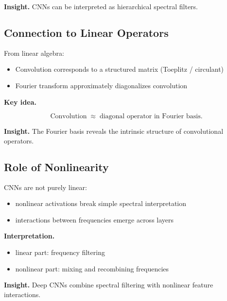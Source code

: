 \medskip

\noindent
\textbf{Insight.}  
CNNs can be interpreted as hierarchical spectral filters.

\subsection{Connection to Linear Operators}

From linear algebra:

\begin{itemize}
    \item Convolution corresponds to a structured matrix (Toeplitz / circulant)
    \item Fourier transform approximately diagonalizes convolution
\end{itemize}

\medskip

\noindent
\textbf{Key idea.}

\[
\text{Convolution} \;\approx\; \text{diagonal operator in Fourier basis}.
\]

\medskip

\noindent
\textbf{Insight.}  
The Fourier basis reveals the intrinsic structure of convolutional operators.

\subsection{Role of Nonlinearity}

CNNs are not purely linear:

\begin{itemize}
    \item nonlinear activations break simple spectral interpretation
    \item interactions between frequencies emerge across layers
\end{itemize}

\medskip

\noindent
\textbf{Interpretation.}

\begin{itemize}
    \item linear part: frequency filtering
    \item nonlinear part: mixing and recombining frequencies
\end{itemize}

\medskip

\noindent
\textbf{Insight.}  
Deep CNNs combine spectral filtering with nonlinear feature interactions.

